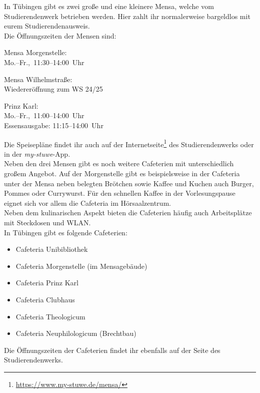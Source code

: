 
In Tübingen gibt es zwei große und eine kleinere Mensa, welche vom
Studierendenwerk betrieben werden. Hier zahlt ihr normalerweise bargeldlos mit
eurem Studierendenausweis.\\ Die Öffnungszeiten der Mensen sind:
\begin{center}

Mensa Morgenstelle:\\
Mo.--Fr.,~11:30--14:00~Uhr

\bigskip

Mensa Wilhelmstraße:\\
Wiedereröffnung zum WS 24/25 %

\bigskip

\nopagebreak
Prinz Karl:\\
Mo.--Fr.,~11:00--14:00~Uhr\\
Essensausgabe: 11:15--14:00~Uhr

\end{center}

Die Speisepläne findet ihr auch auf der
Internetseite\footnote{\url{https://www.my-stuwe.de/mensa/}} des
Studierendenwerks oder in der \emph{my-stuwe}-App.\\

Neben den drei Mensen gibt es noch weitere Cafeterien mit unterschiedlich
großem Angebot. Auf der Morgenstelle gibt es beispielsweise in der Cafeteria
unter der Mensa neben belegten Brötchen sowie Kaffee und Kuchen auch Burger,
Pommes oder Currywurst. Für den schnellen Kaffee in der Vorlesungspause eignet
sich vor allem die Cafeteria im Hörsaalzentrum.\\ Neben dem kulinarischen
Aspekt bieten die Cafeterien häufig auch Arbeitsplätze mit Steckdosen und
WLAN.\\
In Tübingen gibt es folgende Cafeterien:
\begin{itemize}
	\setlength\itemsep{0.3em}
	\item Cafeteria Unibibliothek
	\item Cafeteria Morgenstelle (im Mensagebäude)
	\item Cafeteria Prinz Karl
	\item Cafeteria Clubhaus
	\item Cafeteria Theologicum
	\item Cafeteria Neuphilologicum (Brechtbau)
\end{itemize} Die Öffnungszeiten der Cafeterien findet ihr ebenfalls auf der
Seite des Studierendenwerks.
